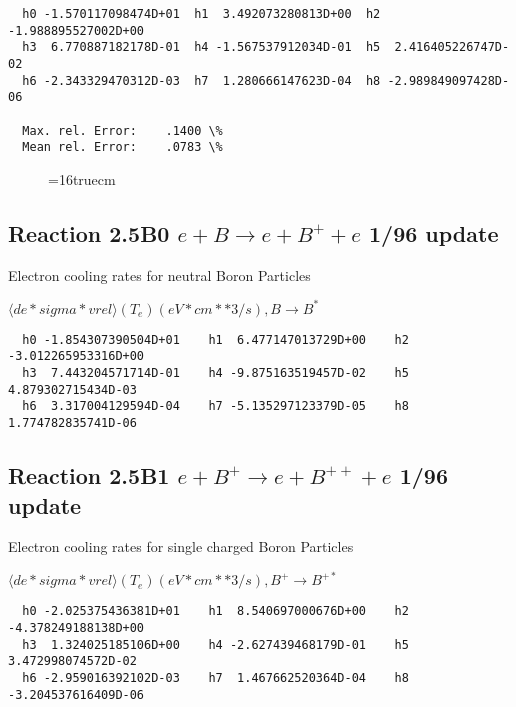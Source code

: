 \documentclass[12pt,dvipdfmx]{article}
\begin{document}
\begin{small}\begin{verbatim}
  h0 -1.570117098474D+01  h1  3.492073280813D+00  h2 -1.988895527002D+00
  h3  6.770887182178D-01  h4 -1.567537912034D-01  h5  2.416405226747D-02
  h6 -2.343329470312D-03  h7  1.280666147623D-04  h8 -2.989849097428D-06

  Max. rel. Error:    .1400 \%
  Mean rel. Error:    .0783 \%

\end{verbatim}\end{small}

\begin{figure} \label{2.4Bl}
\epsfxsize=16truecm
\end{figure}
\newpage

\subsection{
Reaction 2.5B0 $e + B \rightarrow e + B^+ + e $ 1/96 update
}

 Electron cooling rates for neutral
 Boron Particles

$  \langle de*sigma*vrel \rangle(T_e)  (eV*cm**3/s), B   \rightarrow B^* $


\begin{small}\begin{verbatim}
  h0 -1.854307390504D+01    h1  6.477147013729D+00    h2 -3.012265953316D+00
  h3  7.443204571714D-01    h4 -9.875163519457D-02    h5  4.879302715434D-03
  h6  3.317004129594D-04    h7 -5.135297123379D-05    h8  1.774782835741D-06
\end{verbatim}\end{small}

\subsection{
Reaction 2.5B1 $e + B^+ \rightarrow e + B^{++} + e $ 1/96 update
}

 Electron cooling rates for single
 charged Boron Particles

 $ \langle de*sigma*vrel \rangle(T_e)  (eV*cm**3/s), B^+ \rightarrow B^{+*} $


\begin{small}\begin{verbatim}
  h0 -2.025375436381D+01    h1  8.540697000676D+00    h2 -4.378249188138D+00
  h3  1.324025185106D+00    h4 -2.627439468179D-01    h5  3.472998074572D-02
  h6 -2.959016392102D-03    h7  1.467662520364D-04    h8 -3.204537616409D-06
\end{verbatim}\end{small}
\end{document}
